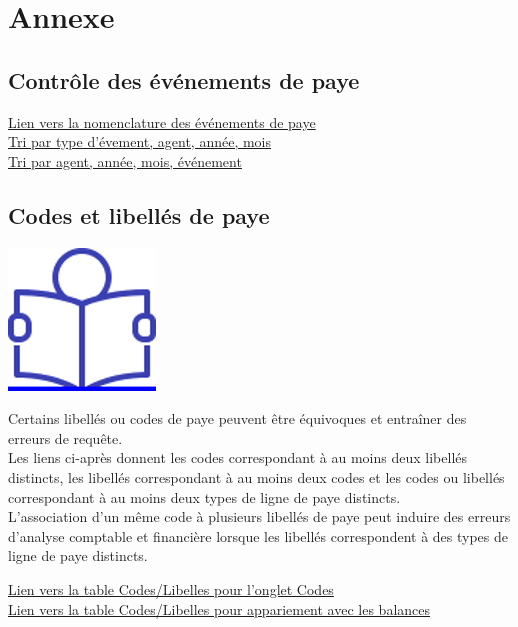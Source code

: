 \newpage

\hypertarget{annexe}{%
\section{Annexe}\label{annexe}}

\hypertarget{controle-des-evenements-de-paye}{%
\subsection{Contrôle des événements de
paye}\label{controle-des-evenements-de-paye}}

\href{../Bases/Fiabilite/Evenements.csv}{Lien vers la nomenclature des
événements de paye}\\
\href{../Bases/Fiabilite/Evenements.ind.csv}{Tri par type d'évement, agent,
année, mois}\\
\href{../Bases/Fiabilite/Evenements.mat.csv}{Tri par agent, année, mois,
événement}

\hypertarget{codes-et-libelles-de-paye}{%
\subsection{Codes et libellés de paye}\label{codes-et-libelles-de-paye}}

\href{../Docs/Notices/fiche_individualisation.odt}{\includegraphics{icones/Notice.png}}

Certains libellés ou codes de paye peuvent être équivoques et entraîner
des erreurs de requête.\\
Les liens ci-après donnent les codes correspondant à au moins deux
libellés distincts, les libellés correspondant à au moins deux codes et
les codes ou libellés correspondant à au moins deux types de ligne de
paye distincts.\\
L'association d'un même code à plusieurs libellés de paye peut induire
des erreurs d'analyse comptable et financière lorsque les libellés
correspondent à des types de ligne de paye distincts.

\href{../Bases/Fiabilite/code.libelle.short.csv}{Lien vers la table
Codes/Libelles pour l'onglet Codes}\\
\href{../Bases/Fiabilite/code.libelle.csv}{Lien vers la table
Codes/Libelles pour appariement avec les balances}

